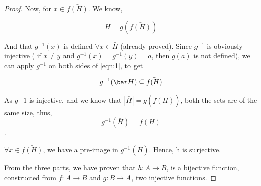 \begin{proof}
Now, for $x \in \bar{f(H)}$. We know,

\begin{equation} \label{eqn:1} \bar H = g(\bar{f(H)}) \end{equation}

And that $g^{-1}(x)$ is defined $\forall x \in \bar H$ (already proved). Since $g^{-1}$ is obviously injective ( if $x \ne y$ and  $g^{-1}(x) = g^{-1}(y) = a$, then $g(a)$ is not defined), we can apply $g^{-1}$ on both sides of \ref{eqn:1}, to get 

$$ g^{-1}(\ba   r H) \subseteq \bar{f(H)}$$

As $g{-1}$ is injective, and we know that $|\bar H| = g(\bar{f(H)})$, both the sets are of the same size, thus,
$$ g^{-1}(\bar H) = \bar{f(H)}$$.

$\forall x \in \bar{f(H)}$, we have a pre-image in $g^{-1}(\bar H)$. Hence, h is surjective.

From the three parts, we have proven that $h : A \to B$, is a bijective function, constructed from $f : A \to B$ and $g : B \to A$, two injective functions.

\end{proof}
